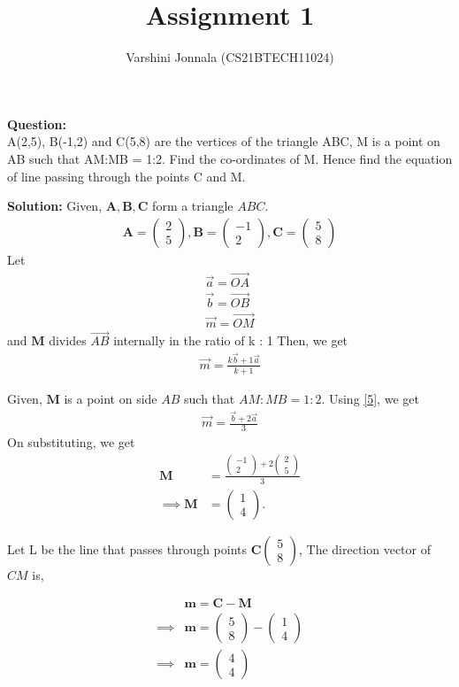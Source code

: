 \documentclass[journal,12pt,twocolumn]{IEEEtran}
\title{Assignment 1}
\author{Varshini Jonnala (CS21BTECH11024)}
\let\vec\mathbf
\newcommand{\myvec}[1]{\ensuremath{\begin{pmatrix}#1\end{pmatrix}}}
\begin{document}
    \maketitle
    \textbf{Question: }\\
      A(2,5), B(-1,2) and C(5,8) are the vertices of the triangle ABC, M is a point on AB such that AM:MB = 1:2. Find the co-ordinates of M. Hence find the equation of line passing through the points C and M.

    \textbf{Solution: }
     Given, $\vec{A}, \vec{B}, \vec{C}$ form a triangle $ABC$.
	\begin{align}
		\vec{A} = \myvec{2 \\ 5} ,
		\vec{B} = \myvec{-1 \\ 2},
		\vec{C} = \myvec{5 \\ 8}
	\end{align}
   Let 
    \begin{align}
        \overrightarrow{a} = \overrightarrow{OA}\\
        \overrightarrow{b} = \overrightarrow{OB}\\
        \overrightarrow{m} = \overrightarrow{OM}
    \end{align}
    and $\vec{M}$ divides $\overrightarrow{AB}$ internally in the ratio of k : 1
    Then, we get 
    \begin{align}
       \label{5} \overrightarrow{m}=\frac{k\overrightarrow{b}+1\overrightarrow{a}}{k+1}
    \end{align}

    Given, $\vec{M}$ is a point on side $AB$ such that $AM:MB = 1:2$. 
        Using \eqref{5}, we get
    \begin{align}
        \overrightarrow{m} = \frac{\overrightarrow{b}+2\overrightarrow{a}}{3}
    \end{align}
    On substituting, we get
    \begin{align}
        \vec{M} &= \frac{\myvec{-1 \\ 2} + 2\myvec{2 \\ 5}}{3}\\ \implies \vec{M} &= \myvec{1\\4}.
    \end{align}
    
    Let L be the line that passes through points $\vec{C}\myvec{5\\8}$,
    The direction vector of $CM$ is,
    
    \begin{align}
        &\vec{m} = \vec{C} - \vec{M}\\
	    \implies &\vec{m} = \myvec{5 \\ 8} - \myvec{1 \\ 4}\\
	    \implies &\vec{m} = \myvec{4 \\ 4}
    \end{align}
    
\end{document}

